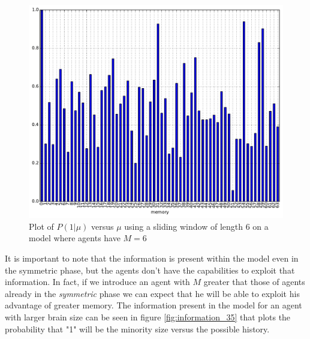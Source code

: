 \begin{figure}[h]
\begin{center}
\includegraphics[scale=0.4]{images/minority/information_probability_m6_a6.pdf}
\caption{Plot of $P(1|\mu)$ versus $\mu$ using a sliding window of length $6$ on a model where agents have $M=6$}
\label{fig:information_66}
\end{center}
\end{figure}

It is important to note that the information is present within the model even in the symmetric phase, but the agents don't have the capabilities to exploit that information.
In fact, if we introduce an agent with $M$ greater that those of agents already in the \textit{symmetric} phase we can expect that he will be able to exploit his advantage of greater memory.
The information present in the model for an agent with larger brain size can be seen in figure \ref{fig:information_35} that plots the probability that "1" will be the minority size versus the possible history.

